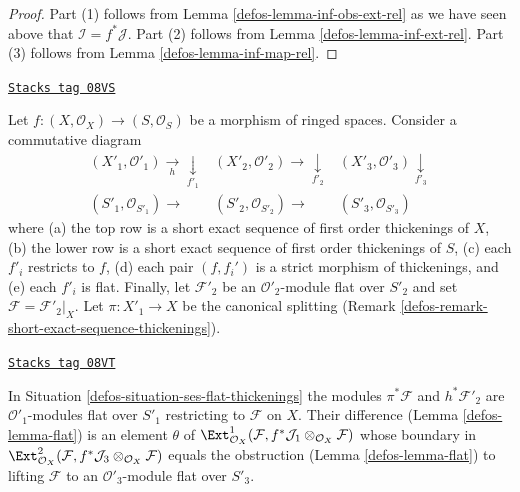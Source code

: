 \begin{proof}

Part (1) follows from Lemma \ref{defos-lemma-inf-obs-ext-rel}
as we have seen above that $\mathcal{I} = f^*\mathcal{J}$.
Part (2) follows from Lemma \ref{defos-lemma-inf-ext-rel}.
Part (3) follows from Lemma \ref{defos-lemma-inf-map-rel}.
\end{proof}

\begin{definition}
\label{defos-situation-ses-flat-thickenings}
\href{https://stacks.math.columbia.edu/tag/08VS}{\texttt{Stacks tag 08VS}}

Let $f : (X, \mathcal{O}_X) \to (S, \mathcal{O}_S)$ be a morphism of
ringed spaces. Consider a commutative diagram
$$
\begin{array}{ccc}(X'_1, \mathcal{O}'_1) \underset{h}{\longrightarrow}\underset{f'_1}{\downarrow} & (X'_2, \mathcal{O}'_2) \longrightarrow\underset{f'_2}{\downarrow} & (X'_3, \mathcal{O}'_3) \underset{f'_3}{\downarrow} \\ (S'_1, \mathcal{O}_{S'_1}) \longrightarrow & (S'_2, \mathcal{O}_{S'_2}) \longrightarrow & (S'_3, \mathcal{O}_{S'_3})\end{array}
$$
where (a) the top row is a short exact sequence of first order thickenings
of $X$, (b) the lower row is a short exact sequence of first order
thickenings of $S$, (c) each $f'_i$ restricts to $f$, (d) each pair
$(f, f_i')$ is a strict morphism of thickenings, and (e) each $f'_i$ is flat.
Finally, let $\mathcal{F}'_2$ be an $\mathcal{O}'_2$-module flat over
$S'_2$ and set $\mathcal{F} = \mathcal{F}'_2|_X$. Let $\pi : X'_1 \to X$
be the canonical splitting
(Remark \ref{defos-remark-short-exact-sequence-thickenings}).
\end{definition}

\begin{lemma}[Verify iv]
\label{defos-lemma-verify-iv}
\href{https://stacks.math.columbia.edu/tag/08VT}{\texttt{Stacks tag 08VT}}

In Situation \ref{defos-situation-ses-flat-thickenings} the modules
$\pi^*\mathcal{F}$ and $h^*\mathcal{F}'_2$ are $\mathcal{O}'_1$-modules
flat over $S'_1$ restricting to $\mathcal{F}$ on $X$.
Their difference (Lemma \ref{defos-lemma-flat}) is an element
$\theta$ of $\Ext^1_{\mathcal{O}_X}(
\mathcal{F}, f^*\mathcal{J}_1 \otimes_{\mathcal{O}_X} \mathcal{F})$
whose boundary in
$\Ext^2_{\mathcal{O}_X}(
\mathcal{F}, f^*\mathcal{J}_3 \otimes_{\mathcal{O}_X} \mathcal{F})$
equals the obstruction (Lemma \ref{defos-lemma-flat})
to lifting $\mathcal{F}$ to an $\mathcal{O}'_3$-module flat over $S'_3$.
\end{lemma}

